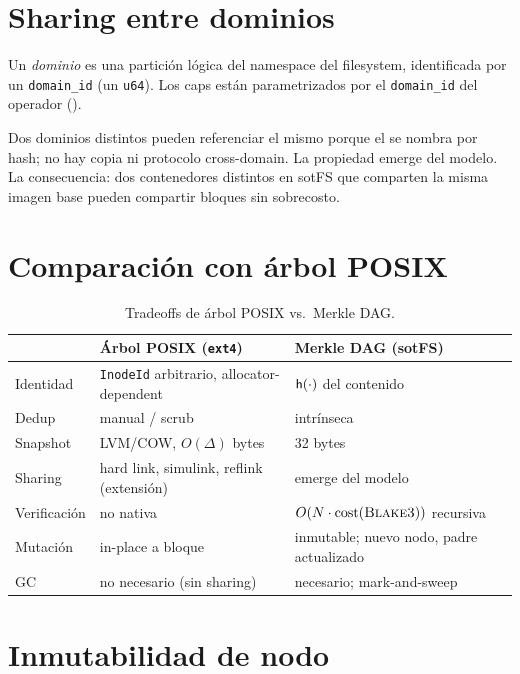 \section{Sharing entre dominios}

\begin{defn}[Dominio]
\label{def:dominio}
Un \emph{dominio} es una partición lógica del namespace del filesystem,
identificada por un \texttt{domain\_id} (un \texttt{u64}). Los caps
están parametrizados por el \texttt{domain\_id} del operador
().
\end{defn}

Dos dominios distintos pueden referenciar el mismo \NBlk{} porque el
\NBlk{} se nombra por hash; no hay copia ni protocolo cross-domain. La
propiedad emerge del modelo. La consecuencia: dos contenedores
distintos en sotFS que comparten la misma imagen base pueden compartir
bloques sin sobrecosto.

\section{Comparación con árbol POSIX}

\begin{table}[h]
\centering
\renewcommand{\arraystretch}{1.2}
\begin{tabularx}{\linewidth}{l X X}
  \toprule
   & \textbf{Árbol POSIX (\texttt{ext4})} & \textbf{Merkle DAG (sotFS)} \\
  \midrule
  Identidad   & \texttt{InodeId} arbitrario, allocator-dependent & $\mathsf{h}(\cdot)$ del contenido \\
  Dedup       & manual / scrub & intrínseca \\
  Snapshot    & LVM/COW, $O(\Delta)$ bytes & 32 bytes \\
  Sharing     & hard link, simulink, reflink (extensión) & emerge del modelo \\
  Verificación & no nativa & $O(N \cdot \mathrm{cost}(\textsc{Blake3}))$ recursiva \\
  Mutación    & in-place a bloque & inmutable; nuevo nodo, padre actualizado \\
  GC          & no necesario (sin sharing) & necesario; mark-and-sweep \\
  \bottomrule
\end{tabularx}
\caption{Tradeoffs de árbol POSIX vs.\ Merkle DAG.}
\label{tab:hash-tradeoffs}
\end{table}

\section{Inmutabilidad de nodo}

